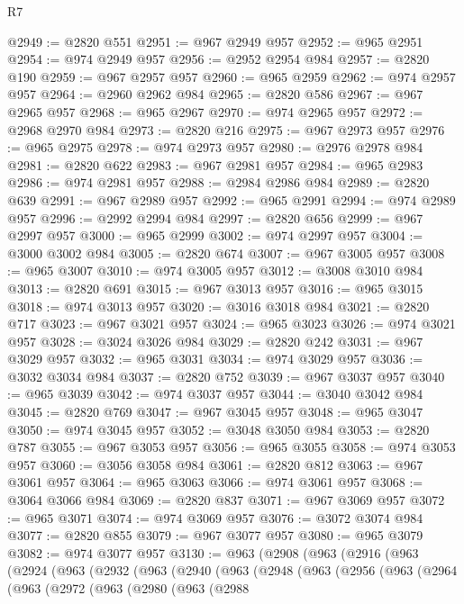 \begin{lexlean}{R7}
\begin{coremodule}
@2949 := @2820 @551
@2951 := @967 @2949 @957
@2952 := @965 @2951
@2954 := @974 @2949 @957
@2956 := @2952 @2954 @984
@2957 := @2820 @190
@2959 := @967 @2957 @957
@2960 := @965 @2959
@2962 := @974 @2957 @957
@2964 := @2960 @2962 @984
@2965 := @2820 @586
@2967 := @967 @2965 @957
@2968 := @965 @2967
@2970 := @974 @2965 @957
@2972 := @2968 @2970 @984
@2973 := @2820 @216
@2975 := @967 @2973 @957
@2976 := @965 @2975
@2978 := @974 @2973 @957
@2980 := @2976 @2978 @984
@2981 := @2820 @622
@2983 := @967 @2981 @957
@2984 := @965 @2983
@2986 := @974 @2981 @957
@2988 := @2984 @2986 @984
@2989 := @2820 @639
@2991 := @967 @2989 @957
@2992 := @965 @2991
@2994 := @974 @2989 @957
@2996 := @2992 @2994 @984
@2997 := @2820 @656
@2999 := @967 @2997 @957
@3000 := @965 @2999
@3002 := @974 @2997 @957
@3004 := @3000 @3002 @984
@3005 := @2820 @674
@3007 := @967 @3005 @957
@3008 := @965 @3007
@3010 := @974 @3005 @957
@3012 := @3008 @3010 @984
@3013 := @2820 @691
@3015 := @967 @3013 @957
@3016 := @965 @3015
@3018 := @974 @3013 @957
@3020 := @3016 @3018 @984
@3021 := @2820 @717
@3023 := @967 @3021 @957
@3024 := @965 @3023
@3026 := @974 @3021 @957
@3028 := @3024 @3026 @984
@3029 := @2820 @242
@3031 := @967 @3029 @957
@3032 := @965 @3031
@3034 := @974 @3029 @957
@3036 := @3032 @3034 @984
@3037 := @2820 @752
@3039 := @967 @3037 @957
@3040 := @965 @3039
@3042 := @974 @3037 @957
@3044 := @3040 @3042 @984
@3045 := @2820 @769
@3047 := @967 @3045 @957
@3048 := @965 @3047
@3050 := @974 @3045 @957
@3052 := @3048 @3050 @984
@3053 := @2820 @787
@3055 := @967 @3053 @957
@3056 := @965 @3055
@3058 := @974 @3053 @957
@3060 := @3056 @3058 @984
@3061 := @2820 @812
@3063 := @967 @3061 @957
@3064 := @965 @3063
@3066 := @974 @3061 @957
@3068 := @3064 @3066 @984
@3069 := @2820 @837
@3071 := @967 @3069 @957
@3072 := @965 @3071
@3074 := @974 @3069 @957
@3076 := @3072 @3074 @984
@3077 := @2820 @855
@3079 := @967 @3077 @957
@3080 := @965 @3079
@3082 := @974 @3077 @957
@3130 := @963
    (@2908
      (@963
        (@2916
          (@963
            (@2924
              (@963
                (@2932
                  (@963
                    (@2940
                      (@963
                        (@2948
                          (@963
                            (@2956
                              (@963
                                (@2964
                                  (@963
                                    (@2972
                                      (@963
                                        (@2980
                                          (@963
                                            (@2988

\end{coremodule}
\end{lexlean}
